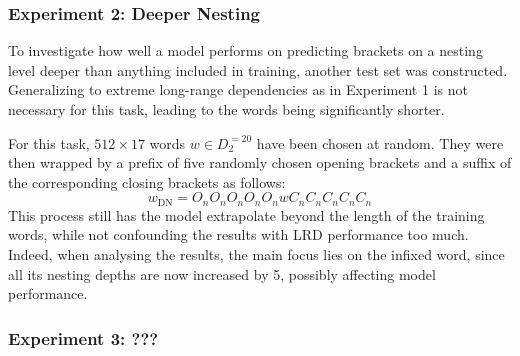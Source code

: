 \subsubsection{Experiment 2: Deeper Nesting}\label{DN}
To investigate how well a model performs on predicting brackets on a nesting level deeper than anything included in training, another test set was constructed. Generalizing to extreme long-range dependencies as in Experiment 1 is not necessary for this task, leading to the words being significantly shorter.

For this task, $512 \times 17$ words $w \in D_{2}^{=20}$ have been chosen at random. They were then wrapped by a prefix of five randomly chosen opening brackets and a suffix of the corresponding closing brackets as follows:
\[
	w_{\text{DN}} = O_{n}O_{n}O_{n}O_{n}O_{n}wC_{n}C_{n}C_{n}C_{n}C_{n}
\]
This process still has the model extrapolate beyond the length of the training words, while not confounding the results with LRD performance too much. Indeed, when analysing the results, the main focus lies on the infixed word, since all its nesting depths are now increased by 5, possibly affecting model performance.

\subsubsection{Experiment 3: ???}